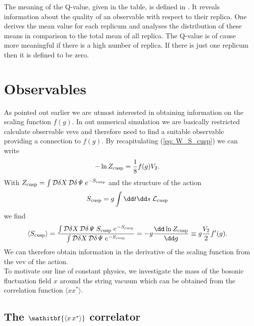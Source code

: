 %
%
%

%
%
%
The meaning of the Q-value, given in the table, is defined in \cite{Wolff:2003sm}. It reveals information about the quality of an observable with respect to their replica. One derives the mean value for each replicum and analyses the distribution of these means in comparison to the total mean of all replica. The Q-value is of cause more meaningful if there is a high number of replica. If there is just one replicum then it is defined to be zero.
%
%
%
%
%
%
%
%
%
%
%
\section{Observables}
As pointed out earlier we are utmost interested in obtaining information on the scaling function $f(g)$. In out numerical simulation we are basically restricted calculate observable vevs and therefore need to find a suitable observable providing a connection to $f(g)$. By recapitulating (\ref{eq: W_S_cusp}) we can write
%
%
\begin{equation}
-\ln Z_{\rm cusp} = \frac{1}{8} f(g)V_{2}.
\end{equation}
%
%
With $Z_{\rm cusp} = \int \mathcal{D}\delta X\,\mathcal{D}\delta \mathit{\Psi}\;e^{-S_{\rm cusp}}$ and the structure of the action 
\begin{equation}
S_{\rm cusp} = g \int \dd t \dd s \; \mathcal{L}_{\rm cusp}
\end{equation}
we find
%
%
\begin{equation}
\langle S_{\rm cusp} \rangle = \frac{\int \mathcal{D}\delta X\,\mathcal{D}\delta\mathit{\Psi} \; S_{\rm cusp} \;e^{-S_{\rm cusp}}}{\int \mathcal{D}\delta X\,\mathcal{D}\delta\mathit{\Psi} \; e^{-S_{\rm cusp}}} = -g \frac{\dd \ln Z_{\rm cusp}}{\dd g} \equiv g\frac{V_{2}}{2} f'(g).
\end{equation}
%
%
We can therefore obtain information in the derivative of the scaling function from the vev of the action.\\
To motivate our line of constant physics, we investigate the mass of the bosonic fluctuation field $x$ around the string vacuum which can be obtained from the correlation function $\langle x x^{*}\rangle$.
%
%
%
\subsection[The $\langle xx^{*}\rangle$ correlator]{The {$\mathitbf{\langle x\,x^{*}\rangle}$} correlator}